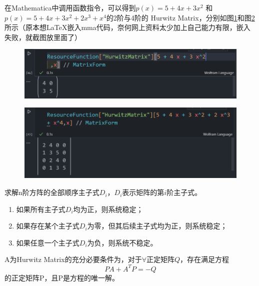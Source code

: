 \documentclass[lang=cn,10pt]{elegantbook}
\begin{document}
\begin{example}
	在Mathematica中调用函数指令，可以得到$p(x)=5+4x+3x^2$
	和$p(x)=5+4x+3x^2+2x^3+x^4$的2阶与4阶的
	Hurwitz Matrix，分别如图\ref{hurwitz1}和图\ref{hurwitz2}
	所示（原本想\LaTeX 嵌入mma代码，奈何网上资料太少加上自己能力有限，嵌入失败，就截图放里面了）
	\begin{figure}[h]
		\centering
		\includegraphics[scale=0.6]{img/hurwitz1.png}
		\caption{}
		\label{hurwitz1}
	\end{figure}
	\begin{figure}[h]
		\centering
		\includegraphics[scale=0.6]{img/hurwitz2.png}
		\caption{}
		\label{hurwitz2}
	\end{figure}
\end{example}

\begin{theorem}
	求解n阶方阵的全部顺序主子式$D_i$，$D_i$表示矩阵的第$i$阶主子式。
	\begin{enumerate}
		\item 如果所有主子式$D_i$均为正，则系统稳定；
		\item 如果存在某个主子式$D_i$为零，但其后续主子式均为正，则系统稳定；
		\item 如果任意一个主子式$D_i$为负，则系统不稳定。
	\end{enumerate}
\end{theorem}

\begin{theorem}
	A为Hurwitz Matrix的充分必要条件为，对于$\forall$正定矩阵$Q$，存在满足方程
	\begin{equation*}
		PA+A^TP=-Q
	\end{equation*}
	的正定矩阵P，且P是方程的唯一解。
\end{theorem}
\end{document}
